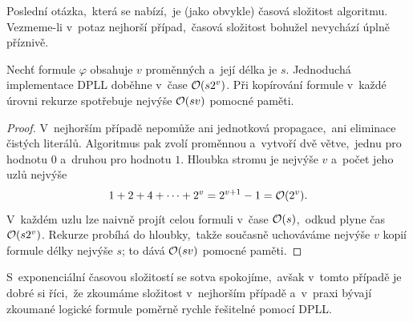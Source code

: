 Poslední otázka,~která se nabízí,~je (jako obvykle) časová složitost algoritmu. Vezmeme-li v~potaz nejhorší případ,~časová složitost bohužel nevychází úplně příznivě.
\begin{theorem}
    Nechť formule $\varphi$ obsahuje $v$ proměnných a~její délka je $s$. Jednoduchá implementace DPLL doběhne v~čase $\mathcal{O}(s2^v)$. Při kopírování formule v~každé úrovni rekurze spotřebuje nejvýše $\mathcal{O}(sv)$ pomocné paměti.
\end{theorem}
\begin{proof}
    V~nejhorším případě nepomůže ani jednotková propagace,~ani eliminace čistých literálů. Algoritmus pak zvolí proměnnou a~vytvoří dvě větve,~jednu pro hodnotu $0$ a~druhou pro hodnotu $1$. Hloubka stromu je nejvýše $v$ a~počet jeho uzlů nejvýše
    \[1+2+4+\dots+2^v=2^{v+1}-1=\mathcal{O}(2^v).\]
    V~každém uzlu lze naivně projít celou formuli v~čase $\mathcal{O}(s)$,~odkud plyne čas $\mathcal{O}(s2^v)$. Rekurze probíhá do hloubky,~takže současně uchováváme nejvýše $v$ kopií formule délky nejvýše $s$; to dává $\mathcal{O}(sv)$ pomocné paměti.
\end{proof}

S~exponenciální časovou složitostí se sotva spokojíme,~avšak v~tomto případě je dobré si říci,~že zkoumáme složitost v~nejhorším případě a~v~praxi bývají zkoumané logické formule poměrně rychle řešitelné pomocí DPLL.
